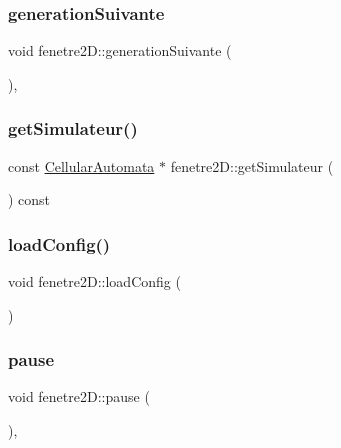 \subsubsection{\texorpdfstring{generation\+Suivante}{generationSuivante}}
{\footnotesize\ttfamily void fenetre2\+D\+::generation\+Suivante (\begin{DoxyParamCaption}{ }\end{DoxyParamCaption})\hspace{0.3cm}{\ttfamily [private]}, {\ttfamily [slot]}}

\mbox{\label{classfenetre2_d_ab8e5b79b50a28c663bde2e83a202d80c}} 
\subsubsection{\texorpdfstring{get\+Simulateur()}{getSimulateur()}}
{\footnotesize\ttfamily const \mbox{\hyperlink{class_cellular_automata}{Cellular\+Automata}} $\ast$ fenetre2\+D\+::get\+Simulateur (\begin{DoxyParamCaption}{ }\end{DoxyParamCaption}) const}

\mbox{\label{classfenetre2_d_a9ee93dcc5e0e7ee3ddcf4bd4bb967162}} 
\subsubsection{\texorpdfstring{load\+Config()}{loadConfig()}}
{\footnotesize\ttfamily void fenetre2\+D\+::load\+Config (\begin{DoxyParamCaption}{ }\end{DoxyParamCaption})}

\mbox{\label{classfenetre2_d_adbc8e3e644842494a6512373e0b82a98}} 
\subsubsection{\texorpdfstring{pause}{pause}}
{\footnotesize\ttfamily void fenetre2\+D\+::pause (\begin{DoxyParamCaption}{ }\end{DoxyParamCaption})\hspace{0.3cm}{\ttfamily [private]}, {\ttfamily [slot]}}

